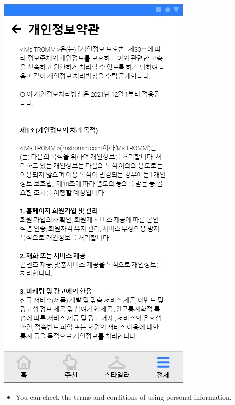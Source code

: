 \documentclass[conference]{IEEEtran}
\begin{document}
\begin{enumerate}
    \centerline{\includegraphics[scale=0.32]{개인정보약관.jpg}}
    \begin{itemize}
    \item[]You can check the terms and conditions of using personal information. \\ \\ \\ \\ \\ \\ \\ \\ \\ \\ \\ \\ \\ \\
    \end{itemize}
\end{enumerate}
\end{document}
